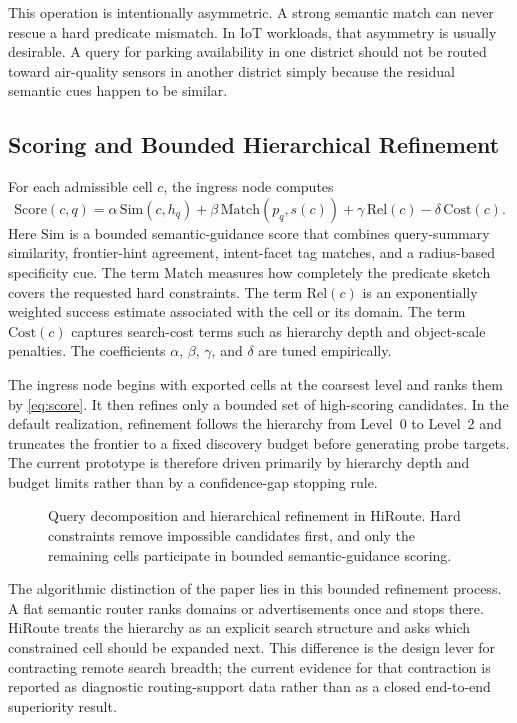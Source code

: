 \documentclass[journal]{IEEEtran}
\newcommand{\sysname}{HiRoute}
\newcommand{\score}{\mathrm{Score}}
\newcommand{\simf}{\mathrm{Sim}}
\newcommand{\matchf}{\mathrm{Match}}
\newcommand{\relf}{\mathrm{Rel}}
\newcommand{\costf}{\mathrm{Cost}}
\newcommand{\placeholderbox}[2]{%
  \begin{center}
  \fbox{\parbox[c][#1][c]{0.93\linewidth}{\centering #2}}
  \end{center}}
\newcommand{\figplaceholder}[4]{%
\begin{figure}[t]
\centering
\placeholderbox{#2}{#3}
\caption{#1}
\label{#4}
\end{figure}}
\begin{document}
This operation is intentionally asymmetric. A strong semantic match can never rescue a hard predicate mismatch. In IoT workloads, that asymmetry is usually desirable. A query for parking availability in one district should not be routed toward air-quality sensors in another district simply because the residual semantic cues happen to be similar.

\subsection{Scoring and Bounded Hierarchical Refinement}

For each admissible cell $c$, the ingress node computes
\begin{equation}
\label{eq:score}
\score(c,q)=\alpha\,\simf(c,h_q)+\beta\,\matchf(p_q,s(c))+\gamma\,\relf(c)-\delta\,\costf(c).
\end{equation}
Here $\simf$ is a bounded semantic-guidance score that combines query-summary similarity, frontier-hint agreement, intent-facet tag matches, and a radius-based specificity cue. The term $\matchf$ measures how completely the predicate sketch covers the requested hard constraints. The term $\relf(c)$ is an exponentially weighted success estimate associated with the cell or its domain. The term $\costf(c)$ captures search-cost terms such as hierarchy depth and object-scale penalties. The coefficients $\alpha$, $\beta$, $\gamma$, and $\delta$ are tuned empirically.

The ingress node begins with exported cells at the coarsest level and ranks them by \eqref{eq:score}. It then refines only a bounded set of high-scoring candidates. In the default realization, refinement follows the hierarchy from Level~0 to Level~2 and truncates the frontier to a fixed discovery budget before generating probe targets. The current prototype is therefore driven primarily by hierarchy depth and budget limits rather than by a confidence-gap stopping rule.

\figplaceholder{Query decomposition and hierarchical refinement in \sysname{}. Hard constraints remove impossible candidates first, and only the remaining cells participate in bounded semantic-guidance scoring.}{4.3cm}{\textit{Query-processing figure placeholder.}}{fig:query}

The algorithmic distinction of the paper lies in this bounded refinement process. A flat semantic router ranks domains or advertisements once and stops there. \sysname{} treats the hierarchy as an explicit search structure and asks which constrained cell should be expanded next. This difference is the design lever for contracting remote search breadth; the current evidence for that contraction is reported as diagnostic routing-support data rather than as a closed end-to-end superiority result.
\end{document}
